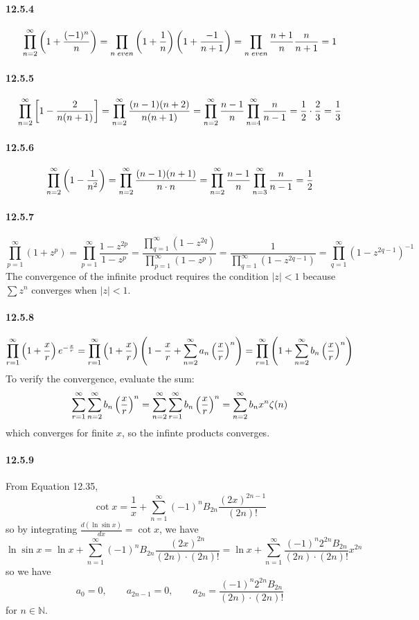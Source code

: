 \documentclass[a4paper]{article}
\begin{document}
\paragraph{12.5.4}
\[
\prod_{n=2}^\infty\left(1+\frac{(-1)^n}{n} \right)=\prod_{n\;even}\left(1+\frac{1}{n} \right)\left(1+\frac{-1}{n+1} \right)=\prod_{n\;even}\frac{n+1}{n}\frac{n}{n+1}=1
\]

\paragraph{12.5.5}
\[
\prod_{n=2}^\infty\left[1-\frac{2}{n(n+1)} \right]=\prod_{n=2}^\infty\frac{(n-1)(n+2)}{n(n+1)}=\prod_{n=2}^\infty\frac{n-1}{n}\prod_{n=4}^\infty\frac{n}{n-1}=\frac{1}{2}\cdot\frac{2}{3}=\frac{1}{3}
\]

\paragraph{12.5.6}
\[
\prod_{n=2}^\infty\left(1-\frac{1}{n^2} \right)=\prod_{n=2}^\infty\frac{(n-1)(n+1)}{n\cdot n}=\prod_{n=2}^\infty\frac{n-1}{n}\prod_{n=3}^\infty\frac{n}{n-1}=\frac{1}{2}
\]

\paragraph{12.5.7}
\[
\prod_{p=1}^\infty(1+z^p)=\prod_{p=1}^\infty\frac{1-z^{2p}}{1-z^p}=\frac{\prod_{q=1}^\infty(1-z^{2q})}{\prod_{p=1}^\infty(1-z^p)}=\frac{1}{\prod_{q=1}^\infty(1-z^{2q-1})}=\prod_{q=1}^\infty(1-z^{2q-1})^{-1}
\]
The convergence of the infinite product requires the condition $|z|<1$ because $\sum z^n$ converges when $|z|<1$.

\paragraph{12.5.8}
\[
\prod_{r=1}^\infty\left(1+\frac{x}{r}\right)e^{-\frac{x}{r}}=\prod_{r=1}^\infty\left(1+\frac{x}{r}\right)\left(1-\frac{x}{r}+\sum_{n=2}^\infty a_n\left(\frac{x}{r}\right)^n\right)=\prod_{r=1}^\infty\left(1+\sum_{n=2}^\infty b_n\left(\frac{x}{r}\right)^n \right)
\]
To verify the convergence, evaluate the sum:
\[
\sum_{r=1}^\infty\sum_{n=2}^\infty b_n\left(\frac{x}{r}\right)^n=\sum_{n=2}^\infty\sum_{r=1}^\infty b_n\left(\frac{x}{r}\right)^n=\sum_{n=2}^\infty b_nx^n\zeta(n)
\]
which converges for finite $x$, so the infinte products converges.

\paragraph{12.5.9}
From Equation 12.35,
\[
\cot x=\frac{1}{x}+\sum_{n=1}^\infty(-1)^n B_{2n}\frac{(2x)^{2n-1}}{(2n)!}
\]
so by integrating $\frac{d(\ln\sin x)}{dx}=\cot x$, we have
\[
\ln\sin x=\ln x+\sum_{n=1}^\infty(-1)^nB_{2n}\frac{(2x)^{2n}}{(2n)\cdot(2n)!}=\ln x+\sum_{n=1}^\infty\frac{(-1)^n 2^{2n}B_{2n}}{(2n)\cdot(2n)!}x^{2n}
\]
so we have
\[
a_0=0,\qquad a_{2n-1}=0,\qquad a_{2n}=\frac{(-1)^n2^{2n}B_{2n}}{(2n)\cdot(2n)!}
\]
for $n\in\mathbb{N}$.
\end{document}
